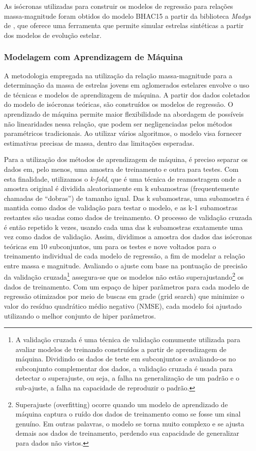         As isócronas utilizadas para construir os modelos de regressão para relações massa-magnitude foram obtidos do modelo BHAC15 a partir da biblioteca \textit{Madys} de , que oferece uma ferramenta que permite simular estrelas sintéticas a partir dos modelos de evolução estelar.
         
    \subsubsection{Modelagem com Aprendizagem de Máquina}
        A metodologia empregada na utilização da relação massa-magnitude para a determinação da massa de estrelas jovens em aglomerados estelares envolve o uso de técnicas e modelos de aprendizagem de máquina.
        A partir dos dados coletados do modelo de isócronas teóricas, são construídos os modelos de regressão. O aprendizado de máquina permite maior flexibilidade na abordagem de possíveis não linearidades nessa relação, que podem ser negligenciadas pelos métodos paramétricos tradicionais. Ao utilizar vários algoritmos, o modelo visa fornecer estimativas precisas de massa, dentro das limitações esperadas.
        
        Para a utilização dos métodos de aprendizagem de máquina, é preciso separar os dados em, pelo menos, uma amostra de treinamento e outra para testes. Com esta finalidade, utilizamos o \textit{k-fold}, que é uma técnica de reamostragem onde a amostra original é dividida aleatoriamente em k subamostras (frequentemente chamadas de “dobras”) de tamanho igual. Das k subamostras, uma subamostra é mantida como dados de validação para testar o modelo, e as k-1 subamostras restantes são usadas como dados de treinamento. O processo de validação cruzada é então repetido k vezes, usando cada uma das k subamostras exatamente uma vez como dados de validação. Assim, dividimos a amostra dos dados das isócronas teóricas em 10 subconjuntos, um para os testes e nove voltados para o treinamento individual de cada modelo de regressão, a fim de modelar a relação entre massa e magnitude. Avaliando o ajuste com base na pontuação de precisão da validação cruzada\footnote{ A validação cruzada é uma técnica de validação comumente utilizada para avaliar modelos de treinando construídos a partir de aprendizagem de máquina. Dividindo os dados de teste em subconjuntos e avaliando-os no subconjunto complementar dos dados, a validação cruzada é usada para detectar o superajuste, ou seja, a falha na generalização de um padrão e o sub-ajuste, a falha na capacidade de reproduzir o padrão.} assegura-se que os modelos não estão superajustando\footnote{ Superajuste (overfitting) ocorre quando um modelo de aprendizado de máquina captura o ruído dos dados de treinamento como se fosse um sinal genuíno. Em outras palavras, o modelo se torna muito complexo e se ajusta demais aos dados de treinamento, perdendo sua capacidade de generalizar para dados não vistos.} os dados de treinamento. Com um espaço de hiper parâmetros para cada modelo de regressão otimizados por meio de buscas em grade (grid search) que minimize o valor do resíduo quadrático médio negativo (NMSE), cada modelo foi ajustado utilizando o melhor conjunto de hiper parâmetros.
        
